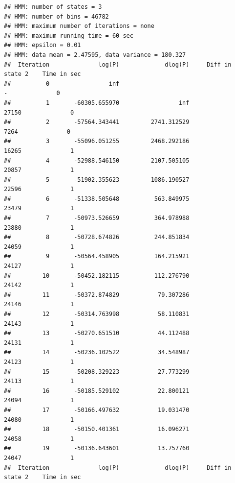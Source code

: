 \documentclass[11pt]{article}\usepackage[]{graphicx}\usepackage[]{color}
\makeatletter
\newenvironment{kframe}{%
 \def\at@end@of@kframe{}%
 \ifinner\ifhmode%
  \def\at@end@of@kframe{\end{minipage}}%
  \begin{minipage}{\columnwidth}%
 \fi\fi%
 \def\FrameCommand##1{\hskip\@totalleftmargin \hskip-\fboxsep
 \colorbox{shadecolor}{##1}\hskip-\fboxsep
     \hskip-\linewidth \hskip-\@totalleftmargin \hskip\columnwidth}%
 \MakeFramed {\advance\hsize-\width
   \@totalleftmargin\z@ \linewidth\hsize
   \@setminipage}}%
 {\par\unskip\endMakeFramed%
 \at@end@of@kframe}
\newenvironment{knitrout}{}{} %
\makeatother
\begin{document}
\begin{scriptsize}
\begin{knitrout}
\begin{kframe}
{\ttfamily\noindent\itshape\color{messagecolor}{\#\# Replaced read counts > 163 (99.9\% quantile) by 163 in 46 bins. Set option 'read.cutoff.quantile=1' to disable this filtering. This filtering was done to increase the speed of the HMM and should not affect the results.\\\#\# ------------------------------------ Try 1 of 1 -------------------------------------}}\begin{verbatim}
## HMM: number of states = 3
## HMM: number of bins = 46782
## HMM: maximum number of iterations = none
## HMM: maximum running time = 60 sec
## HMM: epsilon = 0.01
## HMM: data mean = 2.47595, data variance = 180.327
##  Iteration              log(P)             dlog(P)     Diff in state 2    Time in sec
##          0                -inf                   -                   -              0
##          1       -60305.655970                 inf               27150              0
##          2       -57564.343441         2741.312529                7264              0
##          3       -55096.051255         2468.292186               16265              1
##          4       -52988.546150         2107.505105               20857              1
##          5       -51902.355623         1086.190527               22596              1
##          6       -51338.505648          563.849975               23479              1
##          7       -50973.526659          364.978988               23880              1
##          8       -50728.674826          244.851834               24059              1
##          9       -50564.458905          164.215921               24127              1
##         10       -50452.182115          112.276790               24142              1
##         11       -50372.874829           79.307286               24146              1
##         12       -50314.763998           58.110831               24143              1
##         13       -50270.651510           44.112488               24131              1
##         14       -50236.102522           34.548987               24123              1
##         15       -50208.329223           27.773299               24113              1
##         16       -50185.529102           22.800121               24094              1
##         17       -50166.497632           19.031470               24080              1
##         18       -50150.401361           16.096271               24058              1
##         19       -50136.643601           13.757760               24047              1
##  Iteration              log(P)             dlog(P)     Diff in state 2    Time in sec

\end{verbatim}
\end{kframe}
\end{knitrout}
\end{scriptsize}
\end{document}
